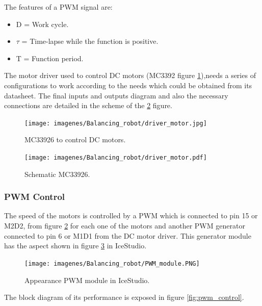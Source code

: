 The features of a PWM signal are: 
\begin{itemize}
	\item D = Work cycle.
	\item $\tau$ = Time-lapse while the function is positive.
	\item T = Function period.
\end{itemize}


The motor driver used to control DC motors (MC3392 figure \ref{fig:driver_motor_fisico}),needs a series of configurations to work according to the needs which could be obtained from its datasheet. The final inputs and outputs diagram and also the necessary connections are detailed in the scheme of the \ref{fig:driver_motor} figure.


\begin{figure}[H]
	\center
	\texttt{[image: imagenes/Balancing\_robot/driver\_motor.jpg]}
	\caption{MC33926 to control DC motors.}
	\label{fig:driver_motor_fisico}
\end{figure}


\begin{figure}[H]
	\center
	\texttt{[image: imagenes/Balancing\_robot/driver\_motor.pdf]}
	\caption{Schematic MC33926.}
	\label{fig:driver_motor}
\end{figure}




\subsubsection{PWM Control}

The speed of the motors is controlled by a PWM which is connected to pin 15 or M2D2, from figure \ref{fig:driver_motor} for each one of the motors and another PWM generator connected to pin 6 or M1D1 from the DC motor driver. This generator module has the aspect shown in figure \ref{fig:pwm_module} in IceStudio. 

\begin{figure}[H]
	\center
	\texttt{[image: imagenes/Balancing\_robot/PWM\_module.PNG]}
	\caption{Appearance PWM module in IceStudio.}
	\label{fig:pwm_module}
\end{figure}

The block diagram of its performance is exposed in figure \ref{fig:pwm_control}.

